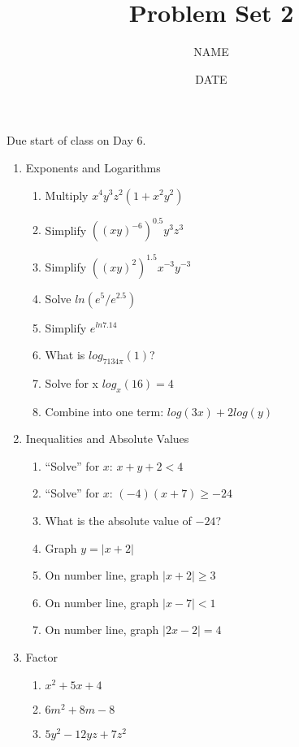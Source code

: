 \documentclass[12pt,thmsa]{article}
\title{Problem Set 2}
\author{NAME}
\date{DATE}
\begin{document}
\maketitle

Due start of class on Day 6. 

\begin{enumerate}
    \item Exponents and Logarithms
        \begin{enumerate}
            \item Multiply $x^4 y^3 z^2 (1 + x^2 y^2)$
            \item Simplify $((xy)^{-6})^{0.5} y^3z^{3}$
            \item Simplify $((xy)^2)^{1.5} x^{-3}y^{-3}$
            \item Solve $ln(e^5/e^{2.5})$
            \item Simplify $e^{ln 7.14}$
            \item What is $log_{7134\pi}(1)$?
            \item Solve for x $log_x(16)=4$ 
            \item Combine into one term: $log(3x)+2log(y)$ 
        \end{enumerate}

    \item Inequalities and Absolute Values
        \begin{enumerate}
            \item ``Solve'' for $x$: $x + y +2 < 4$
            \item ``Solve'' for $x$: $(-4)(x + 7) \geq -24$
            \item What is the absolute value of $-24$?
            \item Graph $y = |x +2|$
            \item On number line, graph $|x + 2| \geq 3$
            \item On number line, graph $|x - 7| < 1$
            \item On number line, graph $|2x - 2| = 4$
        \end{enumerate}

    \item Factor
        \begin{enumerate}
            \item $x^2+ 5x+4$
            \item $6m^2+8m-8$ 
            \item $5y^2-12yz+7z^2$ 
        \end{enumerate}


\end{enumerate}
\end{document}
